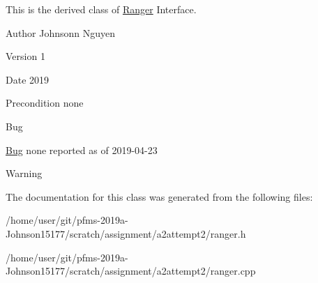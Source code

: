 This is the derived class of \hyperlink{classRanger}{Ranger} Interface.~\newline
\begin{DoxyAuthor}{Author}
Johnsonn Nguyen 
\end{DoxyAuthor}
\begin{DoxyVersion}{Version}
1 
\end{DoxyVersion}
\begin{DoxyDate}{Date}
2019 
\end{DoxyDate}
\begin{DoxyPrecond}{Precondition}
none 
\end{DoxyPrecond}
\begin{DoxyRefDesc}{Bug}
\item[\hyperlink{bug__bug000004}{Bug}]none reported as of 2019-\/04-\/23 \end{DoxyRefDesc}
\begin{DoxyWarning}{Warning}

\end{DoxyWarning}


The documentation for this class was generated from the following files\+:\begin{DoxyCompactItemize}
\item 
/home/user/git/pfms-\/2019a-\/\+Johnson15177/scratch/assignment/a2attempt2/ranger.\+h\item 
/home/user/git/pfms-\/2019a-\/\+Johnson15177/scratch/assignment/a2attempt2/ranger.\+cpp\end{DoxyCompactItemize}

